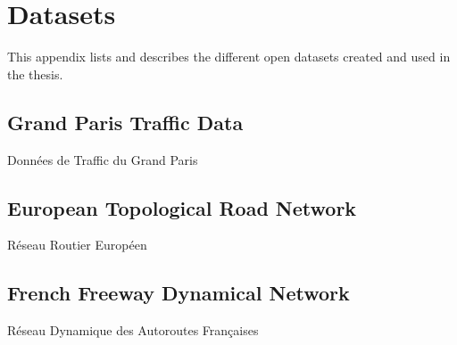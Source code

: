 \chapter{Datasets} %

\label{app:data} %



\headercit{}{}{}



This appendix lists and describes the different open datasets created and used in the thesis.


\section{Grand Paris Traffic Data}{Données de Traffic du Grand Paris}

% 


\section{European Topological Road Network}{Réseau Routier Européen}




\section{French Freeway Dynamical Network}{Réseau Dynamique des Autoroutes Françaises}




